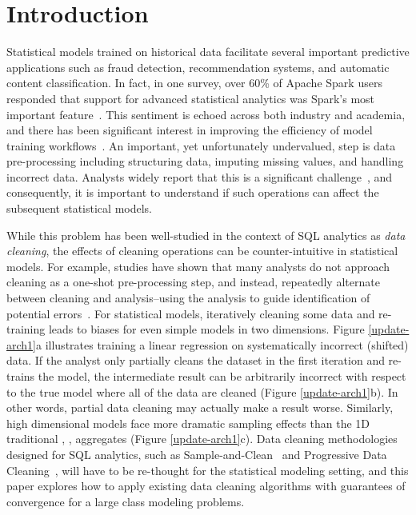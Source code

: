 \section{Introduction}
Statistical models trained on historical data facilitate several important predictive applications such as fraud detection, recommendation systems, and automatic content classification.
In fact, in one survey, over 60\% of Apache Spark users responded that support for advanced statistical analytics was Spark's most important feature~\cite{sparksurvey}.
This sentiment is echoed across both industry and academia, and there has been significant interest in improving the efficiency of model training workflows~\cite{bdas, alexandrov2014stratosphere, crotty2014tupleware, tensor}. 
An important, yet unfortunately undervalued, step is data pre-processing including structuring data, imputing missing values, and handling incorrect data.
Analysts widely report that this is a significant challenge~\cite{kandel2012,nytimes}, and consequently, it is important to understand if such operations can affect the subsequent statistical models.

While this problem has been well-studied in the context of SQL analytics as \emph{data cleaning}, the effects of cleaning operations can be counter-intuitive in statistical models.
For example, studies have shown that many analysts do not approach cleaning as a one-shot pre-processing step, and instead, repeatedly alternate between cleaning and analysis--using the analysis to guide identification of potential errors~\cite{kandel2012}.
For statistical models, iteratively cleaning some data and re-training leads to biases for even simple models in two dimensions.
Figure \ref{update-arch1}a illustrates training a linear regression on systematically incorrect (shifted) data.
If the analyst only partially cleans the dataset in the first iteration and re-trains the model, the intermediate result can be arbitrarily incorrect with respect to the true model where all of the data are cleaned (Figure \ref{update-arch1}b).
In other words, partial data cleaning may actually make a result worse.
Similarly, high dimensional models face more dramatic sampling effects than the 1D traditional \sumfunc, \countfunc, \avgfunc aggregates (Figure \ref{update-arch1}c).
Data cleaning methodologies designed for SQL analytics, such as Sample-and-Clean~\cite{wang1999sample} and Progressive Data Cleaning~\cite{altowim2014progressive, papenbrock2015progressive, DBLP:journals/pvldb/YakoutENOI11}, will have to be re-thought for the statistical modeling setting, and this paper explores how to apply existing data cleaning algorithms with guarantees of convergence for a large class modeling problems. 

